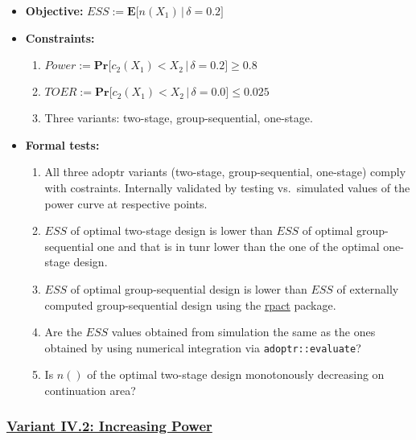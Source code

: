 \documentclass[]{book}
\providecommand{\tightlist}{%
  \setlength{\itemsep}{0pt}\setlength{\parskip}{0pt}}
\begin{document}
\begin{itemize}
\tightlist
\item
  \textbf{Objective:} \(ESS := \boldsymbol{E}\big[n(X_1)\,|\,\delta=0.2\big]\)
\item
  \textbf{Constraints:}

  \begin{enumerate}
  \def\labelenumi{\arabic{enumi}.}
  \tightlist
  \item
    \(Power := \boldsymbol{Pr}\big[c_2(X_1) < X_2\,|\,\delta=0.2\big] \geq 0.8\)
  \item
    \(TOER := \boldsymbol{Pr}\big[c_2(X_1) < X_2\,|\,\delta=0.0\big] \leq 0.025\)
  \item
    Three variants: two-stage, group-sequential, one-stage.
  \end{enumerate}
\item
  \textbf{Formal tests:}

  \begin{enumerate}
  \def\labelenumi{\arabic{enumi}.}
  \tightlist
  \item
    All three adoptr variants (two-stage, group-sequential, one-stage)
    comply with costraints. Internally validated by testing vs.~simulated
    values of the power curve at respective points.
  \item
    \(ESS\) of optimal two-stage design is lower than \(ESS\) of optimal
    group-sequential one and that is in tunr lower than the one of the
    optimal one-stage design.
  \item
    \(ESS\) of optimal group-sequential design is lower than \(ESS\) of
    externally computed group-sequential design using the \href{https://rpact.org/}{rpact} package.
  \item
    Are the \(ESS\) values obtained from simulation the same as the ones
    obtained by using numerical integration via \texttt{adoptr::evaluate}?
  \item
    Is \(n()\) of the optimal two-stage design monotonously decreasing on
    continuation area?
  \end{enumerate}
\end{itemize}

\hypertarget{variant-iv.2-increasing-power}{%
\subsubsection{\texorpdfstring{\protect\hyperlink{variantIV_2}{Variant IV.2: Increasing Power}}{Variant IV.2: Increasing Power}}\label{variant-iv.2-increasing-power}}
\end{document}
